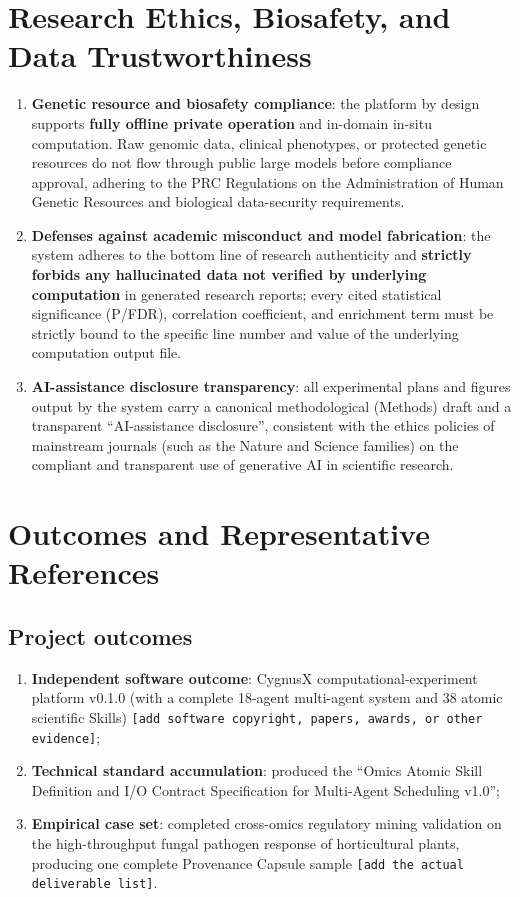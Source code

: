 \documentclass[11pt,a4paper]{article}
\begin{document}
\section{Research Ethics, Biosafety, and Data Trustworthiness}

\begin{enumerate}
  \item \textbf{Genetic resource and biosafety compliance}: the platform by design supports \textbf{fully offline private operation} and in-domain in-situ computation. Raw genomic data, clinical phenotypes, or protected genetic resources do not flow through public large models before compliance approval, adhering to the PRC Regulations on the Administration of Human Genetic Resources and biological data-security requirements.
  \item \textbf{Defenses against academic misconduct and model fabrication}: the system adheres to the bottom line of research authenticity and \textbf{strictly forbids any hallucinated data not verified by underlying computation} in generated research reports; every cited statistical significance (P/FDR), correlation coefficient, and enrichment term must be strictly bound to the specific line number and value of the underlying computation output file.
  \item \textbf{AI-assistance disclosure transparency}: all experimental plans and figures output by the system carry a canonical methodological (Methods) draft and a transparent ``AI-assistance disclosure'', consistent with the ethics policies of mainstream journals (such as the Nature and Science families) on the compliant and transparent use of generative AI in scientific research.
\end{enumerate}

\section{Outcomes and Representative References}

\subsection{Project outcomes}

\begin{enumerate}
  \item \textbf{Independent software outcome}: CygnusX computational-experiment platform v0.1.0 (with a complete 18-agent multi-agent system and 38 atomic scientific Skills) \texttt{[add software copyright, papers, awards, or other evidence]};
  \item \textbf{Technical standard accumulation}: produced the ``Omics Atomic Skill Definition and I/O Contract Specification for Multi-Agent Scheduling v1.0'';
  \item \textbf{Empirical case set}: completed cross-omics regulatory mining validation on the high-throughput fungal pathogen response of horticultural plants, producing one complete Provenance Capsule sample \texttt{[add the actual deliverable list]}.
\end{enumerate}
\end{document}
